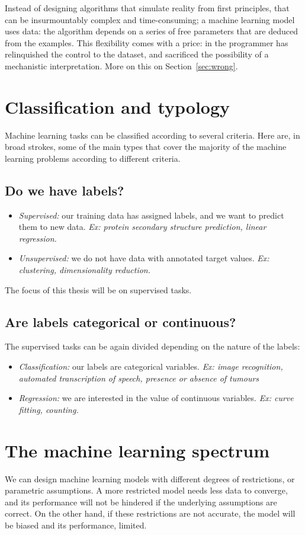 Instead of designing algorithms that simulate reality from first principles, that can be insurmountably complex and time-consuming; a machine learning model uses data: the algorithm depends on a series of free parameters that are deduced from the examples.
This flexibility comes with a price: in the programmer has relinquished the control to the dataset, and sacrificed the possibility of a mechanistic interpretation.
More on this on Section~\ref{sec:wrong}.

\section{Classification and typology}
Machine learning tasks can be classified according to several criteria.
Here are, in broad strokes, some of the main types that cover the majority of the machine learning problems according to different criteria.

\subsection{Do we have labels?}
\begin{itemize}
\item \emph{Supervised:} our training data has assigned labels, and we want to predict them to new data. \emph{Ex: protein secondary structure prediction, linear regression.}
\item \emph{Unsupervised:} we do not have data with annotated target values. \emph{Ex: clustering, dimensionality reduction.}
\end{itemize}

The focus of this thesis will be on supervised tasks.

\subsection{Are labels categorical or continuous?}
The supervised tasks can be again divided depending on the nature of the labels:
\begin{itemize}
\item \emph{Classification:} our labels are categorical variables. \emph{Ex: image recognition, automated transcription of speech, presence or absence of tumours}
\item \emph{Regression:} we are interested in the value of continuous variables. \emph{Ex: curve fitting, counting.}
\end{itemize}

\section{The machine learning spectrum}
We can design machine learning models with different degrees of restrictions, or parametric assumptions.
A more restricted model needs less data to converge, and its performance will not be hindered if the underlying assumptions are correct.
On the other hand, if these restrictions are not accurate, the model will be biased and its performance, limited.

